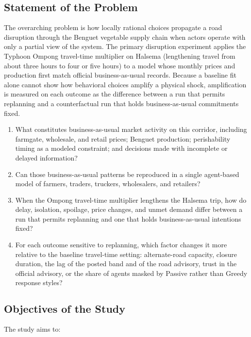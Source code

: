 \documentclass{icsthesis}
\begin{document}
\begin{mainmatter}
			\subsection{Statement of the Problem}

			The overarching problem is how locally rational choices propagate a road disruption through the Benguet vegetable supply chain when actors operate with only a partial view of the system. The primary disruption experiment applies the Typhoon Ompong travel-time multiplier on Halsema (lengthening travel from about three hours to four or five hours) to a model whose monthly prices and production first match official business-as-usual records. Because a baseline fit alone cannot show how behavioral choices amplify a physical shock, amplification is measured on each outcome as the difference between a run that permits replanning and a counterfactual run that holds business-as-usual commitments fixed.

			\begin{enumerate}
				\item What constitutes business-as-usual market activity on this corridor, including farmgate, wholesale, and retail prices; Benguet production; perishability timing as a modeled constraint; and decisions made with incomplete or delayed information?
				\item Can those business-as-usual patterns be reproduced in a single agent-based model of farmers, traders, truckers, wholesalers, and retailers?
				\item When the Ompong travel-time multiplier lengthens the Halsema trip, how do delay, isolation, spoilage, price changes, and unmet demand differ between a run that permits replanning and one that holds business-as-usual intentions fixed?
				\item For each outcome sensitive to replanning, which factor changes it more relative to the baseline travel-time setting: alternate-road capacity, closure duration, the lag of the posted band and of the road advisory, trust in the official advisory, or the share of agents masked by Passive rather than Greedy response styles?
			\end{enumerate}

			\subsection{Objectives of the Study}

			The study aims to:


\end{mainmatter}
\end{document}
